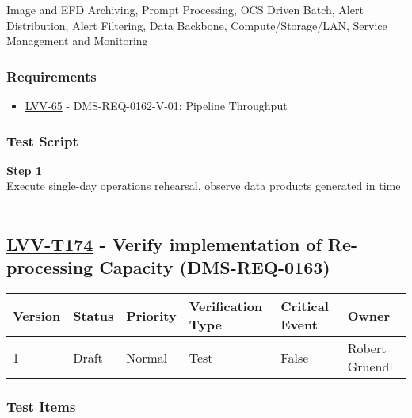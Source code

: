 Image and EFD Archiving, Prompt Processing, OCS Driven Batch, Alert
Distribution, Alert Filtering, Data Backbone, Compute/Storage/LAN,
Service Management and Monitoring~

\hypertarget{requirements-150}{%
\subsubsection{Requirements}\label{requirements-150}}

\begin{itemize}
\tightlist
\item
  \href{https://jira.lsstcorp.org/browse/LVV-65}{LVV-65} -
  DMS-REQ-0162-V-01: Pipeline Throughput
\end{itemize}

\hypertarget{test-script-150}{%
\subsubsection{Test Script}\label{test-script-150}}

\textbf{Step 1}\\
Execute single-day operations rehearsal, observe data products generated
in time\\
~\\

\hypertarget{lvv-t174---verify-implementation-of-re-processing-capacity-dms-req-0163}{%
\subsection{\texorpdfstring{\href{https://jira.lsstcorp.org/secure/Tests.jspa\#/testCase/LVV-T174}{LVV-T174}
- Verify implementation of Re-processing Capacity
(DMS-REQ-0163)}{LVV-T174 - Verify implementation of Re-processing Capacity (DMS-REQ-0163)}}\label{lvv-t174---verify-implementation-of-re-processing-capacity-dms-req-0163}}

\begin{longtable}[]{@{}llllll@{}}
\toprule
Version & Status & Priority & Verification Type & Critical Event &
Owner\tabularnewline
\midrule
\endhead
1 & Draft & Normal & Test & False & Robert Gruendl\tabularnewline
\bottomrule
\end{longtable}

\hypertarget{test-items-150}{%
\subsubsection{Test Items}\label{test-items-150}}

